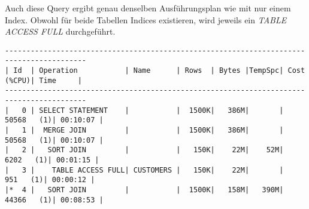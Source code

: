 \documentclass[11pt,a4paper,parskip=half]{scrartcl}
\begin{document}
Auch diese Query ergibt genau denselben Ausführungsplan wie mit nur einem Index. Obwohl für beide Tabellen Indices existieren, wird jeweils ein \emph{TABLE ACCESS FULL} durchgeführt.
\begin{lstlisting}
-----------------------------------------------------------------------------------------                                                                                                                                                                                                                    
| Id  | Operation           | Name      | Rows  | Bytes |TempSpc| Cost (%CPU)| Time     |                                                                                                                                                                                                                    
-----------------------------------------------------------------------------------------                                                                                                                                                                                                                    
|   0 | SELECT STATEMENT    |           |  1500K|   386M|       | 50568   (1)| 00:10:07 |                                                                                                                                                                                                                    
|   1 |  MERGE JOIN         |           |  1500K|   386M|       | 50568   (1)| 00:10:07 |                                                                                                                                                                                                                    
|   2 |   SORT JOIN         |           |   150K|    22M|    52M|  6202   (1)| 00:01:15 |                                                                                                                                                                                                                    
|   3 |    TABLE ACCESS FULL| CUSTOMERS |   150K|    22M|       |   951   (1)| 00:00:12 |                                                                                                                                                                                                                    
|*  4 |   SORT JOIN         |           |  1500K|   158M|   390M| 44366   (1)| 00:08:53 |                                                                                                                                                                                                                    

\end{lstlisting}
\end{document}
